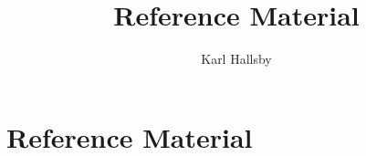 \documentclass[10pt,letterpaper,final,twoside,notitlepage]{article}
\author{Karl Hallsby}
\title{Reference Material}
\theoremstyle{plain}
\theoremstyle{definition}
\theoremstyle{remark}
\begin{document}
\tableofcontents
\clearpage











	







\clearpage
\appendix
{}

\section{Reference Material} \label{sec:Reference Material}


\end{document}
